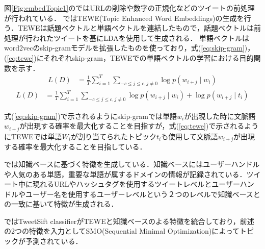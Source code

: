 図\ref{Fig:embedTopic1}のではURLの削除や数字の正規化などのツイートの前処理が行われている．
ではTEWE(Topic Enhanced Word Embeddings)の生成を行う．TEWEは話題ベクトルと単語ベクトルを連結したもので，話題ベクトルは前処理が行われたツイートを基にLDAを使用して生成される．
単語ベクトルはword2vecのskip-gramモデルを拡張したものを使っており，式(\ref{eq:skip-gram})，(\ref{eq:tewe})にそれぞれskip-gram，TEWEでの単語ベクトルの学習における目的関数を示す．
\begin{equation}
\begin{aligned}
\label{eq:skip-gram}
L(D) & =  \frac{1}{T} \sum^{T}_{i=1} \sum_{-c \leq j \leq c, j \neq 0} \log p(w_{i+j} \mid w_i)
\end{aligned}
\end{equation}
\begin{equation}
\begin{aligned}
\label{eq:tewe}
L(D) & =  \frac{1}{T} \sum^{T}_{i=1} \sum_{-c \leq j \leq c, j \neq 0} \log p(w_{i+j} \mid w_i) + \log p(w_{i+j} \mid t_i)
\end{aligned}
\end{equation}

式(\ref{eq:skip-gram})で示されるようにskip-gramでは単語$w_i$が出現した時に文脈語$w_{i+j}$が出現する確率を最大化することを目指すが，式(\ref{eq:tewe})で示されるようにTEWEでは単語$W_i$が割り当てられたトピック$t_i$も使用して文脈語$w_{i+j}$が出現する確率を最大化することを目指している．

では知識ベースに基づく特徴を生成している．知識ベースにはユーザーハンドルや人気のある単語，重要な単語が属するドメインの情報が記録されている．ツイート中に現れるURLやハッシュタグを使用するツイートレベルとユーザーハンドルやユーザー名を使用するユーザーレベルという２つのレベルで知識ベースとの一致に基いて特徴が生成される．%

ではTweetSift classifierがTEWEと知識ベースのよる特徴を統合しており，前述の2つの特徴を入力としてSMO(Sequential Minimal Optimization)\cite{SMO}によってトピックが予測されている．


